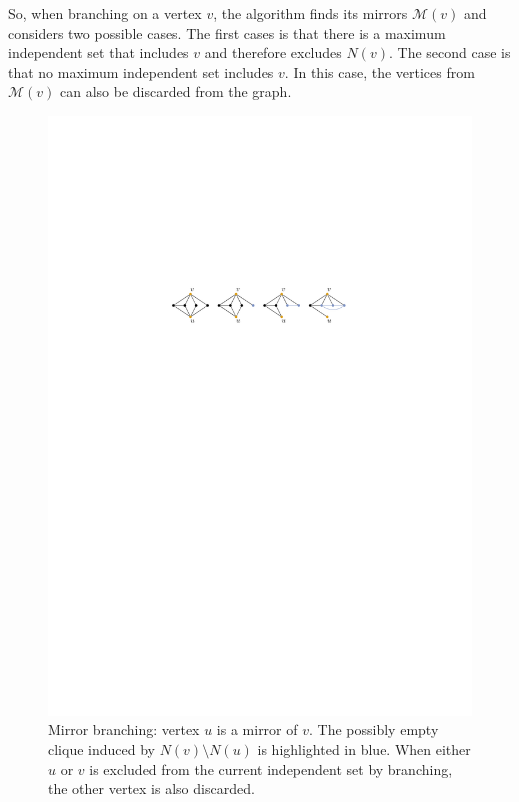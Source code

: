 \documentclass[12pt,a4paper,twoside]{scrartcl}
\numberwithin{equation}{section}
\begin{document}
So, when branching on a vertex $v$, the algorithm finds its mirrors $\mathcal{M}(v)$ and considers two possible cases. The first cases is that there is a maximum independent set that includes $v$ and therefore excludes $N(v)$. The second case is that no maximum independent set includes $v$. In this case, the vertices from $\mathcal{M}(v)$ can also be discarded from the graph.

\begin{figure}[htb]
	\captionsetup{belowskip=-1em}
	\includegraphics[scale=1.5]{images/mirror}
	\centering
	\caption{Mirror branching: vertex $u$ is a mirror of $v$. The possibly empty clique induced by $N(v)\setminus N(u)$ is highlighted in blue. When either $u$ or $v$ is excluded from the current independent set by branching, the other vertex is also discarded. }
	\label{fig:mirror}
\end{figure}
\end{document}

